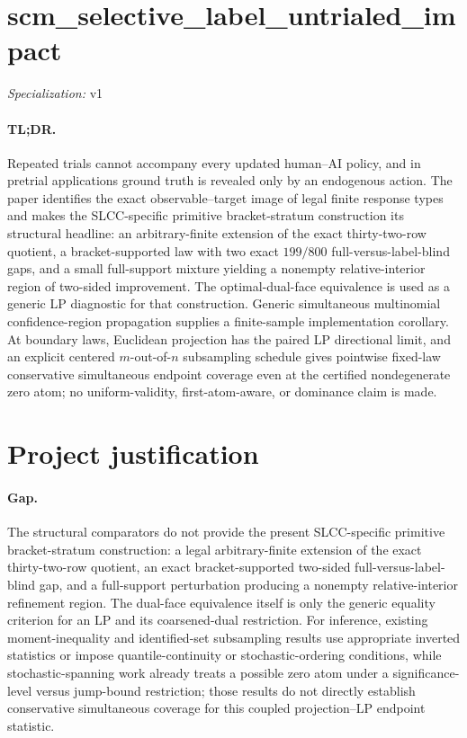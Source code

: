 \documentclass{article}
\begin{document}
\sloppy

\section*{scm\_\allowbreak{}selective\_\allowbreak{}label\_\allowbreak{}untrialed\_\allowbreak{}impact}

\noindent\textit{Specialization:} v1\par

\paragraph{TL;DR.} Repeated trials cannot accompany every updated human--AI policy, and in pretrial applications ground truth is revealed only by an endogenous action. The paper identifies the exact observable--target image of legal finite response types and makes the SLCC-specific primitive bracket-stratum construction its structural headline: an arbitrary-finite extension of the exact thirty-two-row quotient, a bracket-supported law with two exact \(199/800\) full-versus-label-blind gaps, and a small full-support mixture yielding a nonempty relative-interior region of two-sided improvement. The optimal-dual-face equivalence is used as a generic LP diagnostic for that construction. Generic simultaneous multinomial confidence-region propagation supplies a finite-sample implementation corollary. At boundary laws, Euclidean projection has the paired LP directional limit, and an explicit centered \(m\)-out-of-\(n\) subsampling schedule gives pointwise fixed-law conservative simultaneous endpoint coverage even at the certified nondegenerate zero atom; no uniform-validity, first-atom-aware, or dominance claim is made.

\section{Project justification}

\paragraph{Gap.} The structural comparators do not provide the present SLCC-specific primitive bracket-stratum construction: a legal arbitrary-finite extension of the exact thirty-two-row quotient, an exact bracket-supported two-sided full-versus-label-blind gap, and a full-support perturbation producing a nonempty relative-interior refinement region. The dual-face equivalence itself is only the generic equality criterion for an LP and its coarsened-dual restriction. For inference, existing moment-inequality and identified-set subsampling results use appropriate inverted statistics or impose quantile-continuity or stochastic-ordering conditions, while stochastic-spanning work already treats a possible zero atom under a significance-level versus jump-bound restriction; those results do not directly establish conservative simultaneous coverage for this coupled projection--LP endpoint statistic.
\end{document}
